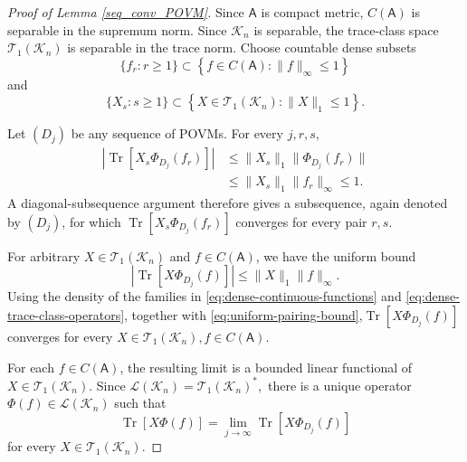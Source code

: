 \documentclass{article}
\theoremstyle{named}
\theoremstyle{named1}
\newcommand{\Tr}{\operatorname{Tr}}
\theoremstyle{plain}
\theoremstyle{remark}
\begin{document}
\begin{proof}[Proof of Lemma \ref{seq_conv_POVM}]
Since \(\mathsf A\) is
compact metric, \(C(\mathsf A)\) is separable in the supremum norm. Since
\(\mathcal K_n\) is separable, the trace-class space
\(\mathcal T_1(\mathcal K_n)\) is separable in the trace norm. Choose
countable dense subsets
\begin{equation}
    \{f_r:r\geq1\}
    \subset
    \left\{
        f\in C(\mathsf A):
        \|f\|_\infty\leq1
    \right\}
    \label{eq:dense-continuous-functions}
\end{equation}
and
\begin{equation}
    \{X_s:s\geq1\}
    \subset
    \left\{
        X\in\mathcal T_1(\mathcal K_n):
        \|X\|_1\leq1
    \right\}.
    \label{eq:dense-trace-class-operators}
\end{equation}

Let \((D_j)\) be any sequence of POVMs. For every \(j,r,s\),
\begin{align}
    \left|
        \Tr\!\left[
            X_s\Phi_{D_j}(f_r)
        \right]
    \right|
    &\leq
    \|X_s\|_1
    \|\Phi_{D_j}(f_r)\|
    \nonumber\\
    &\leq
    \|X_s\|_1
    \|f_r\|_\infty
    \leq1.
    \label{eq:bounded-matrix-elements}
\end{align}
A diagonal-subsequence argument therefore gives a subsequence, again denoted
by \((D_j)\), for which
$\Tr\!\left[
        X_s\Phi_{D_j}(f_r)
    \right]
    $
converges for every pair \(r,s\).

For arbitrary \(X\in\mathcal T_1(\mathcal K_n)\) and
\(f\in C(\mathsf A)\), we have the uniform bound
\begin{equation}
    \left|
        \Tr\!\left[
            X\Phi_{D_j}(f)
        \right]
    \right|
    \leq
    \|X\|_1\|f\|_\infty.
    \label{eq:uniform-pairing-bound}
\end{equation}
Using the density of the families in
\eqref{eq:dense-continuous-functions} and
\eqref{eq:dense-trace-class-operators}, together with
\eqref{eq:uniform-pairing-bound},$\Tr\!\left[
        X\Phi_{D_j}(f)
    \right]
    $ converges for every 
$
    X\in\mathcal T_1(\mathcal K_n),
    f\in C(\mathsf A).
$

For each \(f\in C(\mathsf A)\), the resulting limit is a bounded linear
functional of \(X\in\mathcal T_1(\mathcal K_n)\). Since
$\mathcal L(\mathcal K_n)
    =
    \mathcal T_1(\mathcal K_n)^*,
$
there is a unique operator \(\Phi(f)\in\mathcal L(\mathcal K_n)\) such that
\begin{equation}
    \Tr[X\Phi(f)]
    =
    \lim_{j\to\infty}
    \Tr\!\left[
        X\Phi_{D_j}(f)
    \right]
    \label{eq:limiting-positive-map}
\end{equation}
for every \(X\in\mathcal T_1(\mathcal K_n)\).


\end{proof}
\end{document}
